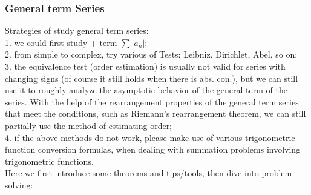 \subsubsection{General term Series}
Strategies of study general term series: \\
1. we could first study +-term $\sum |a_n|$; \\
2. from simple to complex, try various of Tests: Leibniz, Dirichlet, Abel, so on; \\
3. the equivalence test (order estimation) is usually not valid for series with changing signs (of course it still holds when there is abs. con.), but we can still use it to roughly analyze the asymptotic behavior of the general term of the series. With the help of the rearrangement properties of the general term series that meet the conditions, such as Riemann's rearrangement theorem, we can still partially use the method of estimating order; \\
4. if the above methods do not work, please make use of various trigonometric function conversion formulas, when dealing with summation problems involving trigonometric functions. \\
Here we first introduce some theorems and tips/tools, then dive into problem solving: \\
\newline\newline
